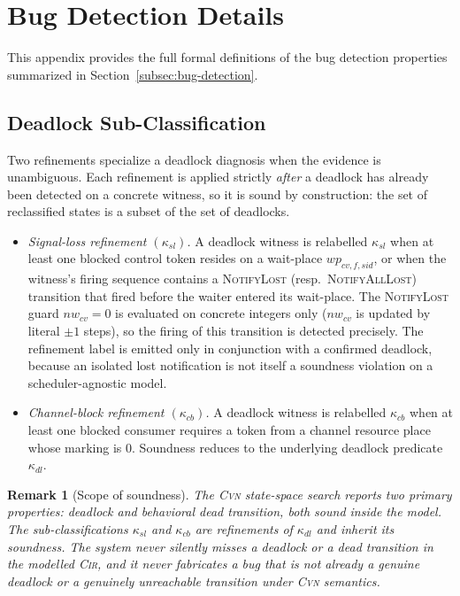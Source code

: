 \documentclass{article}
\newtheorem{remark}{Remark}
\begin{document}
\section{Bug Detection Details}
\label{app:bug-detection-details}

This appendix provides the full formal definitions of the bug
detection properties summarized in Section~\ref{subsec:bug-detection}.

\subsection{Deadlock Sub-Classification}

Two refinements specialize a deadlock diagnosis when the evidence is
unambiguous.  Each refinement is applied strictly \emph{after} a
deadlock has already been detected on a concrete witness, so it is
sound by construction: the set of reclassified states is a subset of
the set of deadlocks.

\begin{itemize}[leftmargin=1.5em]
  \item \emph{Signal-loss refinement $(\kappa_{sl})$.}
    A deadlock witness is relabelled $\kappa_{sl}$ when at least one
    blocked control token resides on a wait-place
    $wp_{cv,f,\mathit{sid}}$, or when the witness's firing sequence
    contains a \textsc{NotifyLost} (resp.\ \textsc{NotifyAllLost})
    transition that fired before the waiter entered its wait-place.
    The \textsc{NotifyLost} guard $nw_{cv}=0$ is evaluated on concrete
    integers only ($nw_{cv}$ is updated by literal $\pm 1$ steps), so
    the firing of this transition is detected precisely.  The
    refinement label is emitted only in conjunction with a confirmed
    deadlock, because an isolated lost notification is not itself a
    soundness violation on a scheduler-agnostic model.

  \item \emph{Channel-block refinement $(\kappa_{cb})$.}
    A deadlock witness is relabelled $\kappa_{cb}$ when at least one
    blocked consumer requires a token from a channel resource place
    whose marking is $0$.  Soundness reduces to the underlying
    deadlock predicate $\kappa_{dl}$.
\end{itemize}

\begin{remark}[Scope of soundness]
\label{rem:soundness-scope}
The \textsc{Cvn} state-space search reports two primary properties:
\emph{deadlock} and \emph{behavioral dead transition}, both sound
inside the model.  The sub-classifications $\kappa_{sl}$ and
$\kappa_{cb}$ are refinements of $\kappa_{dl}$ and inherit its
soundness.  The system never silently misses a deadlock or a dead
transition in the modelled \textsc{Cir}, and it never fabricates a bug
that is not already a genuine deadlock or a genuinely unreachable
transition under \textsc{Cvn} semantics.
\end{remark}
\end{document}
